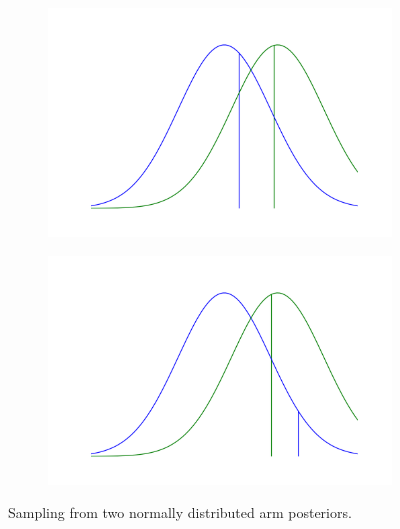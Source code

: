 \documentclass[12pt, a4paper, pdflatex, leqno]{report}
\begin{document}
\begin{figure}[htbp]
\centering
  \begin{subfigure}[b]{0.49\textwidth}
    \centering
    \includegraphics[width=0.99\linewidth]{graphics/sim1.png}
    \caption{\label{fig:sim1}}
  \end{subfigure}
  \begin{subfigure}[b]{0.49\textwidth}
    \centering
    \includegraphics[width=0.99\linewidth]{graphics/sim2.png}
    \caption{\label{fig:sim2}}
  \end{subfigure}
\begin{tiny}
\caption{Sampling from two normally distributed arm posteriors.\label{fig:sim}}
\end{tiny}
\vspace{1cm}
\end{figure}
\end{document}
